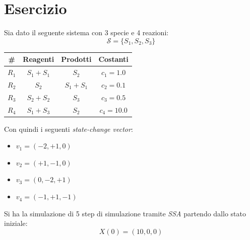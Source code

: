 \documentclass{article}
\begin{document}
\section*{Esercizio}
Sia dato il seguente sistema con 3 specie e 4 reazioni:
\[\mathcal{S}=\{S_1,S_2,S_3\}\]
\begin{table}[H]
  \centering
  \begin{tabular}{c|c|c|c}
    \# & \textbf{Reagenti} & \textbf{Prodotti} & \textbf{Costanti}\\
    \hline
    \hline
    $R_1$ & $S_1+S_1$ & $S_2$ & $c_1=1.0$\\
    $R_2$ & $S_2$ & $S_1+S_1$ & $c_2=0.1$\\
    $R_3$ & $S_2+S_2$ & $S_3$ & $c_3=0.5$\\
    $R_4$ & $S_1+S_3$ & $S_2$ & $c_4=10.0$\\
  \end{tabular}
\end{table}
Con quindi i seguenti \textit{state-change vector}:
\begin{multicols}{2}
  \begin{itemize}
    \item $v_1=(-2,+1,0)$
    \item $v_2=(+1,-1,0)$
    \item $v_3=(0,-2,+1)$
    \item $v_4=(-1,+1,-1)$
  \end{itemize}
\end{multicols}
\newpage
Si ha la simulazione di 5 step di simulazione tramite \textit{SSA} partendo
dallo stato iniziale:
\[X(0)=(10,0,0)\]
\end{document}

